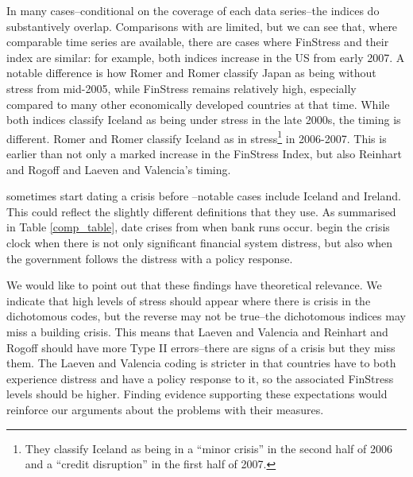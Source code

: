 \documentclass[]{article}
\begin{document}
In many cases--conditional on the coverage of each data series--the indices do substantively overlap. Comparisons with \cite{Romer2015} are limited, but we can see that, where comparable time series are available, there are cases where FinStress and their index are similar: for example, both indices increase in the US from early 2007. A notable difference is how Romer and Romer classify Japan as being without stress from mid-2005, while FinStress remains relatively high, especially compared to many other economically developed countries at that time. While both indices classify Iceland as being under stress in the late 2000s, the timing is different. Romer and Romer classify Iceland as in stress\footnote{They classify Iceland as being in a ``minor crisis'' in the second half of 2006 and a ``credit  disruption'' in the first half of 2007.} in 2006-2007. This is earlier than not only a marked increase in the FinStress Index, but also Reinhart and Rogoff and Laeven and Valencia's timing.

\cite{Reinhart2009} sometimes start dating a crisis before \cite{laeven2013}--notable cases include Iceland and Ireland. This could reflect the slightly different definitions that they use. As summarised in Table \ref{comp_table}, \cite{Reinhart2009} date crises from when bank runs occur. \cite{laeven2013} begin the crisis clock when there is not only significant financial system distress, but also when the government follows the distress with a policy response.

We would like to point out that these findings have theoretical relevance. We indicate that high levels of stress should appear where there is crisis in the dichotomous codes, but the reverse may not be true--the dichotomous indices may miss a building crisis. This means that Laeven and Valencia and Reinhart and Rogoff should have more Type II errors--there are signs of a crisis but they miss them. The Laeven and Valencia coding is stricter in that countries have to both experience distress and have a policy response to it, so the associated FinStress levels should be higher. Finding evidence supporting these expectations would reinforce our arguments about the problems with their measures.
\end{document}
